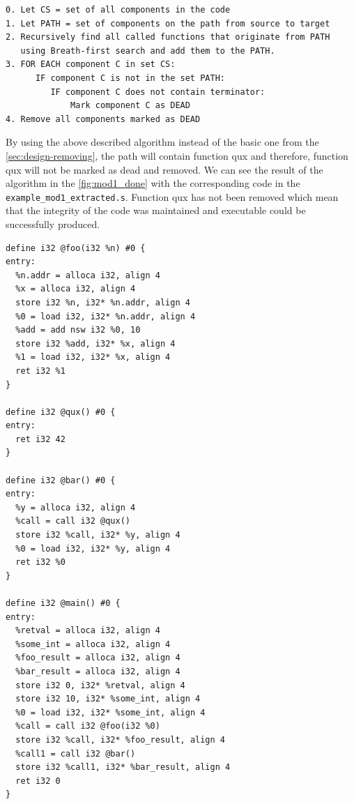 \documentclass[12pt, twoside]{fithesis2}
\renewcommand{\_}{\leavevmode \kern0.07em\vbox{\hrule width0.4em}}
\begin{document}
\begin{verbatim}
0. Let CS = set of all components in the code
1. Let PATH = set of components on the path from source to target
2. Recursively find all called functions that originate from PATH
   using Breath-first search and add them to the PATH.
3. FOR EACH component C in set CS:
      IF component C is not in the set PATH:
         IF component C does not contain terminator:
             Mark component C as DEAD
4. Remove all components marked as DEAD
\end{verbatim}

By using the above described algorithm instead of the basic one from the
\autoref{sec:design-removing}, the path will contain function qux and therefore,
function qux will not be marked as dead and removed.
We can see the result of the algorithm in the \autoref{fig:mod1_done} with the
corresponding code in the \texttt{example_mod1_extracted.s}.
Function qux has not been removed which mean that the integrity of the code
was maintained and executable could be successfully produced.

\begin{verbatim}
define i32 @foo(i32 %n) #0 {
entry:
  %n.addr = alloca i32, align 4
  %x = alloca i32, align 4
  store i32 %n, i32* %n.addr, align 4
  %0 = load i32, i32* %n.addr, align 4
  %add = add nsw i32 %0, 10
  store i32 %add, i32* %x, align 4
  %1 = load i32, i32* %x, align 4
  ret i32 %1
}

define i32 @qux() #0 {
entry:
  ret i32 42
}

define i32 @bar() #0 {
entry:
  %y = alloca i32, align 4
  %call = call i32 @qux()
  store i32 %call, i32* %y, align 4
  %0 = load i32, i32* %y, align 4
  ret i32 %0
}

define i32 @main() #0 {
entry:
  %retval = alloca i32, align 4
  %some_int = alloca i32, align 4
  %foo_result = alloca i32, align 4
  %bar_result = alloca i32, align 4
  store i32 0, i32* %retval, align 4
  store i32 10, i32* %some_int, align 4
  %0 = load i32, i32* %some_int, align 4
  %call = call i32 @foo(i32 %0)
  store i32 %call, i32* %foo_result, align 4
  %call1 = call i32 @bar()
  store i32 %call1, i32* %bar_result, align 4
  ret i32 0
}
\end{verbatim}
\end{document}
